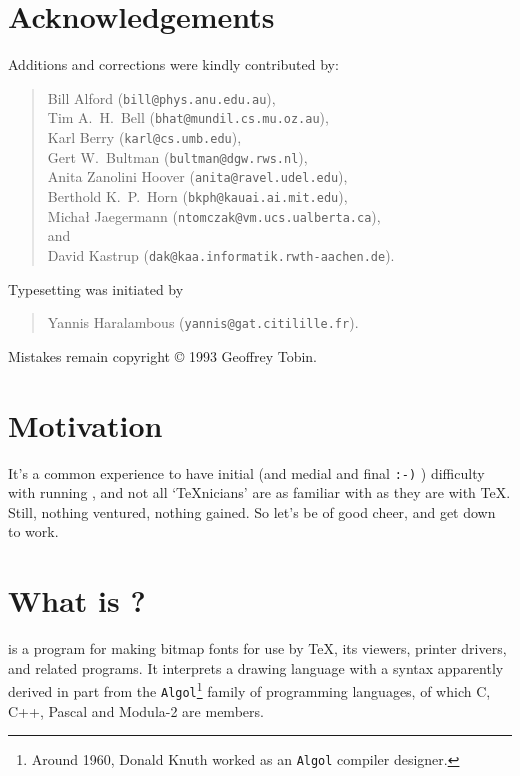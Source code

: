\section*{Acknowledgements}%

Additions and corrections were kindly contributed by:
\begin{quote}
Bill {\sc Alford} ({\tt bill@phys.anu.edu.au}),\\
Tim A.~H.~{\sc Bell} ({\tt bhat@mundil.cs.mu.oz.au}),\\
Karl {\sc Berry} ({\tt karl@cs.umb.edu}),\\
Gert W.~{\sc Bultman} ({\tt bultman@dgw.rws.nl}),\\
Anita {\sc Zanolini Hoover} ({\tt anita@ravel.udel.edu}),\\
Berthold K.~P.~{\sc Horn} ({\tt bkph@kauai.ai.mit.edu}),\\
Micha{\l} {\sc Jaegermann} ({\tt ntomczak@vm.ucs.ualberta.ca}),\\
\hspace*{4em}and\\
David {\sc Kastrup} ({\tt dak@kaa.informatik.rwth-aachen.de}).
\end{quote}

Typesetting was initiated by
\begin{quote}
Yannis {\sc Haralambous} ({\tt yannis@gat.citilille.fr}).
\end{quote}

Mistakes remain copyright \copyright{} 1993 Geoffrey {\sc Tobin}.


\section*{Motivation}%

It's a common experience to have initial (and medial and final
{\tt :-)} ) difficulty with running \MF{}, and not all `\TeX{}nicians'
are as familiar with \MF{} as they are with \TeX{}.  Still, nothing
ventured, nothing gained.  So let's be of good cheer, and get down to
work.


\section{What is \MF{}?}

\MF{} is a program for making bitmap fonts for use by \TeX{},
its viewers, printer drivers, and related programs.
It interprets a drawing language
with a syntax apparently derived in part from the {\tt Algol}\footnote
{Around 1960, Donald {\sc Knuth} worked as an {\tt Algol} compiler
designer.}
family of programming languages, of which C, C++, Pascal and Modula-2
are members.

